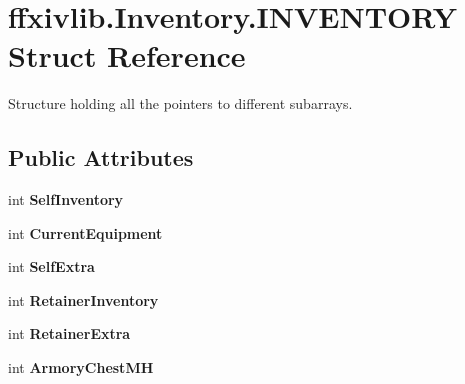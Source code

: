 \hypertarget{structffxivlib_1_1_inventory_1_1_i_n_v_e_n_t_o_r_y}{\section{ffxivlib.\-Inventory.\-I\-N\-V\-E\-N\-T\-O\-R\-Y Struct Reference}
\label{structffxivlib_1_1_inventory_1_1_i_n_v_e_n_t_o_r_y}
}


Structure holding all the pointers to different subarrays.  


\subsection*{Public Attributes}
\begin{DoxyCompactItemize}
\item 
\hypertarget{structffxivlib_1_1_inventory_1_1_i_n_v_e_n_t_o_r_y_ac0f5be363ecb379898b7817c95ea70ed}{int {\bfseries Self\-Inventory}}\label{structffxivlib_1_1_inventory_1_1_i_n_v_e_n_t_o_r_y_ac0f5be363ecb379898b7817c95ea70ed}

\item 
\hypertarget{structffxivlib_1_1_inventory_1_1_i_n_v_e_n_t_o_r_y_a58e1145f416a01d06bc62f0d17b0caf7}{int {\bfseries Current\-Equipment}}\label{structffxivlib_1_1_inventory_1_1_i_n_v_e_n_t_o_r_y_a58e1145f416a01d06bc62f0d17b0caf7}

\item 
\hypertarget{structffxivlib_1_1_inventory_1_1_i_n_v_e_n_t_o_r_y_a2ac46e0331904c79e9a04a93b0c5390e}{int {\bfseries Self\-Extra}}\label{structffxivlib_1_1_inventory_1_1_i_n_v_e_n_t_o_r_y_a2ac46e0331904c79e9a04a93b0c5390e}

\item 
\hypertarget{structffxivlib_1_1_inventory_1_1_i_n_v_e_n_t_o_r_y_a59089a87d1689e5732a7c6c2769e2343}{int {\bfseries Retainer\-Inventory}}\label{structffxivlib_1_1_inventory_1_1_i_n_v_e_n_t_o_r_y_a59089a87d1689e5732a7c6c2769e2343}

\item 
\hypertarget{structffxivlib_1_1_inventory_1_1_i_n_v_e_n_t_o_r_y_a3b795132a81284ea20b65d3458bf3c9a}{int {\bfseries Retainer\-Extra}}\label{structffxivlib_1_1_inventory_1_1_i_n_v_e_n_t_o_r_y_a3b795132a81284ea20b65d3458bf3c9a}

\item 
\hypertarget{structffxivlib_1_1_inventory_1_1_i_n_v_e_n_t_o_r_y_a17bdc1c22e5262d4b3ed2e2634f217a4}{int {\bfseries Armory\-Chest\-M\-H}}\label{structffxivlib_1_1_inventory_1_1_i_n_v_e_n_t_o_r_y_a17bdc1c22e5262d4b3ed2e2634f217a4}


\end{DoxyCompactItemize}
